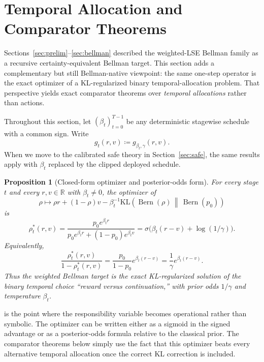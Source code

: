 \documentclass{article}
\newtheorem{proposition}[proposition]{Proposition}
\theoremstyle{remark}
\DeclareMathOperator{\Bern}{Bern}
\newcommand{\R}{\mathbb{R}}
\newcommand{\KL}{\mathrm{KL}}
\newcommand{\defeq}{\coloneqq}
\newcommand{\pprior}{p_0}
\newcommand{\KLbin}[2]{\KL\!\left(\Bern(#1)\,\middle\|\,\Bern(#2)\right)}
\begin{document}

\section{Temporal Allocation and Comparator Theorems}
\label{sec:temporal-regret}

Sections~\ref{sec:prelim}--\ref{sec:bellman} described the weighted-LSE Bellman family as a recursive certainty-equivalent Bellman target.
This section adds a complementary but still Bellman-native viewpoint: the same one-step operator is the exact optimizer of a KL-regularized binary temporal-allocation problem.
That perspective yields exact comparator theorems over \emph{temporal allocations} rather than actions.

Throughout this section, let $(\beta_t)_{t=0}^{T-1}$ be any deterministic stagewise schedule with a common sign.
Write
\[
 g_t(r,v) \defeq g_{\beta_t,\gamma}(r,v).
\]
When we move to the calibrated safe theory in Section~\ref{sec:safe}, the same results apply with $\beta_t$ replaced by the clipped deployed schedule.

\begin{proposition}[Closed-form optimizer and posterior-odds form]
\label{prop:ew-update}
For every stage $t$ and every $r,v\in\R$ with $\beta_t\neq 0$, the optimizer of
\[
\rho \mapsto \rho r + (1-\rho)v - \beta_t^{-1}\KLbin{\rho}{\pprior}
\]
is
\begin{equation}
\rho_t^*(r,v)=\frac{\pprior e^{\beta_t r}}{\pprior e^{\beta_t r} + (1-\pprior)e^{\beta_t v}}
=\sigma\!\bigl(\beta_t(r-v)+\log(1/\gamma)\bigr).
\label{eq:exp-weights-rho}
\end{equation}
Equivalently,
\begin{equation}
\frac{\rho_t^*(r,v)}{1-\rho_t^*(r,v)}
=\frac{\pprior}{1-\pprior}e^{\beta_t(r-v)}
=\frac{1}{\gamma}e^{\beta_t(r-v)}.
\label{eq:odds-update}
\end{equation}
Thus the weighted Bellman target is the exact KL-regularized solution of the binary temporal choice ``reward versus continuation,'' with prior odds $1/\gamma$ and temperature $\beta_t$.
\end{proposition}

 is the point where the responsibility variable becomes operational rather than symbolic.
The optimizer can be written either as a sigmoid in the signed advantage or as a posterior-odds formula relative to the classical prior.
The comparator theorems below simply use the fact that this optimizer beats every alternative temporal allocation once the correct KL correction is included.
\end{document}
